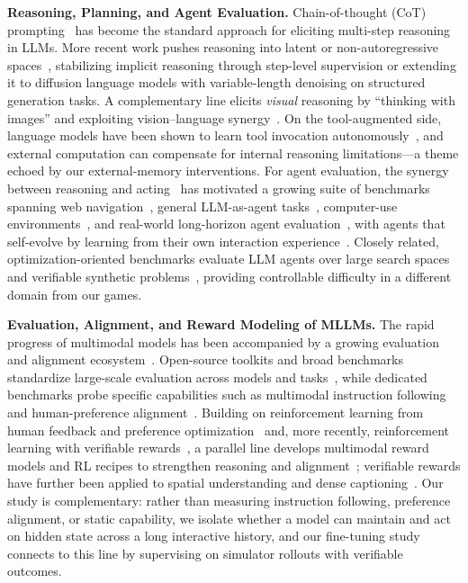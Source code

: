 \noindent\textbf{Reasoning, Planning, and Agent Evaluation.}
Chain-of-thought (CoT) prompting~\citep{wei2022chain,kojima2022large} has become the standard approach for eliciting multi-step reasoning in LLMs. More recent work pushes reasoning into latent or non-autoregressive spaces~\citep{nye2021show,wxl_wei2026simcot,wxl_dai2026endocot,nie2025llada,li2025beyond}, stabilizing implicit reasoning through step-level supervision or extending it to diffusion language models with variable-length denoising on structured generation tasks. A complementary line elicits \emph{visual} reasoning by ``thinking with images'' and exploiting vision--language synergy~\citep{hu2024visualsketchpad,zhang2026etchr,zhang2025thinkvisually}. On the tool-augmented side, language models have been shown to learn tool invocation autonomously~\citep{schick2023toolformer,wxl_zhang2023toolmath}, and external computation can compensate for internal reasoning limitations---a theme echoed by our external-memory interventions. For agent evaluation, the synergy between reasoning and acting~\citep{yao2023react} has motivated a growing suite of benchmarks spanning web navigation~\citep{zhou2024webarena,deng2024mind2web}, general LLM-as-agent tasks~\citep{liu2023agentbench}, computer-use environments~\citep{xie2024osworld}, and real-world long-horizon agent evaluation~\citep{wxl_ding2026wildclawbench}, with agents that self-evolve by learning from their own interaction experience~\citep{sun2025seagent}. Closely related, optimization-oriented benchmarks evaluate LLM agents over large search spaces and verifiable synthetic problems~\citep{li2025optbench,li2025npengine}, providing controllable difficulty in a different domain from our games.

\noindent\textbf{Evaluation, Alignment, and Reward Modeling of MLLMs.}
The rapid progress of multimodal models has been accompanied by a growing evaluation and alignment ecosystem~\citep{zhang2025lmmsurvey}. Open-source toolkits and broad benchmarks standardize large-scale evaluation across models and tasks~\citep{duan2024vlmevalkit,yue2024mmmu}, while dedicated benchmarks probe specific capabilities such as multimodal instruction following~\citep{zhou2023ifeval,ding2025mmifengine} and human-preference alignment~\citep{zhao2025omnialignv}. Building on reinforcement learning from human feedback and preference optimization~\citep{ouyang2022instructgpt,rafailov2023dpo} and, more recently, reinforcement learning with verifiable rewards~\citep{deepseekai2025r1}, a parallel line develops multimodal reward models and RL recipes to strengthen reasoning and alignment~\citep{yu2024rlhfv,zang2025xcomposerreward,ding2026armthinker,liu2025spark,liu2026visualerm,zhao2026trustcritic,liu2025visualrft}; verifiable rewards have further been applied to spatial understanding and dense captioning~\citep{chen2024spatialvlm,yang2026caprl,liu2026spatialssrl}. Our study is complementary: rather than measuring instruction following, preference alignment, or static capability, we isolate whether a model can maintain and act on hidden state across a long interactive history, and our fine-tuning study connects to this line by supervising on simulator rollouts with verifiable outcomes.

